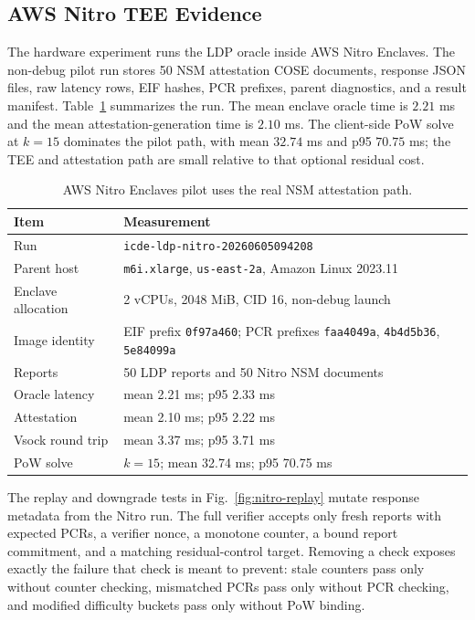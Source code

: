 \documentclass[conference]{IEEEtran}
\begin{document}
\subsection{AWS Nitro TEE Evidence}

The hardware experiment runs the LDP oracle inside AWS Nitro Enclaves. The non-debug pilot run stores 50 NSM attestation COSE documents, response JSON files, raw latency rows, EIF hashes, PCR prefixes, parent diagnostics, and a result manifest. Table~\ref{tab:aws} summarizes the run. The mean enclave oracle time is $2.21$ ms and the mean attestation-generation time is $2.10$ ms. The client-side PoW solve at $k=15$ dominates the pilot path, with mean $32.74$ ms and p95 $70.75$ ms; the TEE and attestation path are small relative to that optional residual cost.

\begin{table}[t]
\caption{AWS Nitro Enclaves pilot uses the real NSM attestation path.}
\label{tab:aws}
\centering
\footnotesize
\begin{tabularx}{\columnwidth}{p{}X}
\toprule
Item & Measurement \\
\midrule
Run & \texttt{icde-ldp-nitro-20260605094208} \\
Parent host & \texttt{m6i.xlarge}, \texttt{us-east-2a}, Amazon Linux 2023.11 \\
Enclave allocation & 2 vCPUs, 2048 MiB, CID 16, non-debug launch \\
Image identity & EIF prefix \texttt{0f97a460}; PCR prefixes \texttt{faa4049a}, \texttt{4b4d5b36}, \texttt{5e84099a} \\
Reports & 50 LDP reports and 50 Nitro NSM documents \\
Oracle latency & mean 2.21 ms; p95 2.33 ms \\
Attestation & mean 2.10 ms; p95 2.22 ms \\
Vsock round trip & mean 3.37 ms; p95 3.71 ms \\
PoW solve & $k=15$; mean 32.74 ms; p95 70.75 ms \\
\bottomrule
\end{tabularx}
\end{table}

The replay and downgrade tests in Fig.~\ref{fig:nitro-replay} mutate response metadata from the Nitro run. The full verifier accepts only fresh reports with expected PCRs, a verifier nonce, a monotone counter, a bound report commitment, and a matching residual-control target. Removing a check exposes exactly the failure that check is meant to prevent: stale counters pass only without counter checking, mismatched PCRs pass only without PCR checking, and modified difficulty buckets pass only without PoW binding.
\end{document}

